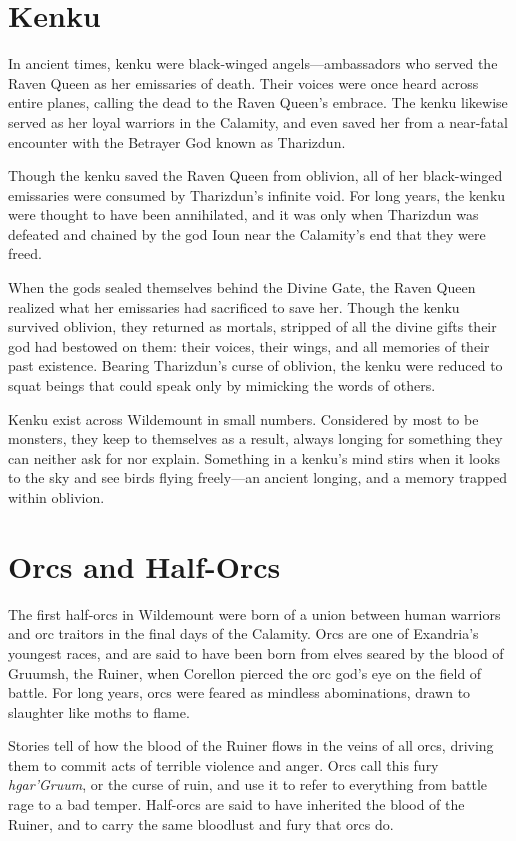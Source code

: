 \documentclass[10pt,a4paper,twoside,bg=print,twocolumn,openany,nodeprecatedcode]{dndbook}
\begin{document}
\section{Kenku}
In ancient times, kenku were black-winged angels—ambassadors who served the Raven Queen as her emissaries of death. Their voices were once heard across entire planes, calling the dead to the Raven Queen's embrace. The kenku likewise served as her loyal warriors in the Calamity, and even saved her from a near-fatal encounter with the Betrayer God known as Tharizdun.

Though the kenku saved the Raven Queen from oblivion, all of her black-winged emissaries were consumed by Tharizdun's infinite void. For long years, the kenku were thought to have been annihilated, and it was only when Tharizdun was defeated and chained by the god Ioun near the Calamity's end that they were freed.

When the gods sealed themselves behind the Divine Gate, the Raven Queen realized what her emissaries had sacrificed to save her. Though the kenku survived oblivion, they returned as mortals, stripped of all the divine gifts their god had bestowed on them: their voices, their wings, and all memories of their past existence. Bearing Tharizdun's curse of oblivion, the kenku were reduced to squat beings that could speak only by mimicking the words of others.

Kenku exist across Wildemount in small numbers. Considered by most to be monsters, they keep to themselves as a result, always longing for something they can neither ask for nor explain. Something in a kenku's mind stirs when it looks to the sky and see birds flying freely—an ancient longing, and a memory trapped within oblivion.

\section{Orcs and Half-Orcs}
The first half-orcs in Wildemount were born of a union between human warriors and orc traitors in the final days of the Calamity. Orcs are one of Exandria's youngest races, and are said to have been born from elves seared by the blood of Gruumsh, the Ruiner, when Corellon pierced the orc god's eye on the field of battle. For long years, orcs were feared as mindless abominations, drawn to slaughter like moths to flame.

Stories tell of how the blood of the Ruiner flows in the veins of all orcs, driving them to commit acts of terrible violence and anger. Orcs call this fury \textit{hgar'Gruum}, or the curse of ruin, and use it to refer to everything from battle rage to a bad temper. Half-orcs are said to have inherited the blood of the Ruiner, and to carry the same bloodlust and fury that orcs do.
\end{document}
